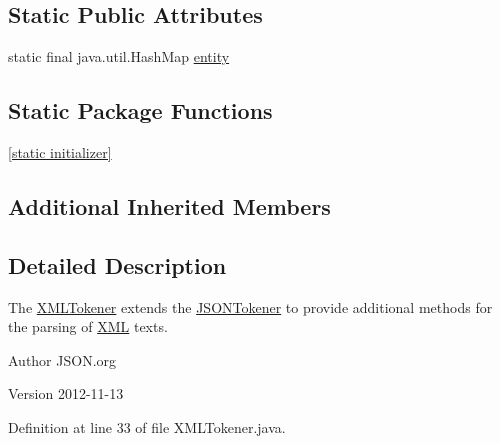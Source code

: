 \subsection*{Static Public Attributes}
\begin{DoxyCompactItemize}
\item 
static final java.\-util.\-Hash\-Map \hyperlink{classorg_1_1json_1_1_x_m_l_tokener_ac0e11bf2c9d16e89993773e8510d44b7}{entity}
\end{DoxyCompactItemize}
\subsection*{Static Package Functions}
\begin{DoxyCompactItemize}
\item 
\hyperlink{classorg_1_1json_1_1_x_m_l_tokener_affe5431a4051cdede936b836296cd059}{\mbox{[}static initializer\mbox{]}}
\end{DoxyCompactItemize}
\subsection*{Additional Inherited Members}


\subsection{Detailed Description}
The \hyperlink{classorg_1_1json_1_1_x_m_l_tokener}{X\-M\-L\-Tokener} extends the \hyperlink{classorg_1_1json_1_1_j_s_o_n_tokener}{J\-S\-O\-N\-Tokener} to provide additional methods for the parsing of \hyperlink{classorg_1_1json_1_1_x_m_l}{X\-M\-L} texts. \begin{DoxyAuthor}{Author}
J\-S\-O\-N.\-org 
\end{DoxyAuthor}
\begin{DoxyVersion}{Version}
2012-\/11-\/13 
\end{DoxyVersion}


Definition at line 33 of file X\-M\-L\-Tokener.\-java.



